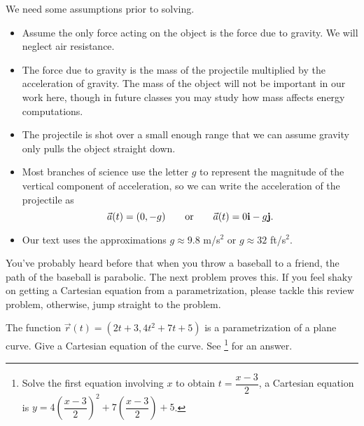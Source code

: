 We need some assumptions prior to solving. 
\begin{itemize}
 \item Assume the only force acting on the object is the force due to gravity. We will neglect air resistance. 
 \item The force due to gravity is the mass of the projectile multiplied by the acceleration of gravity. The mass of the object will not be important in our work here, though in future classes you may study how mass affects energy computations. 
 \item The projectile is shot over a small enough range that we can assume gravity only pulls the object straight down.
 \item Most branches of science use the letter $g$ to represent the magnitude of the vertical component of acceleration, so we can write the acceleration of the projectile as 
$$\vec a(t) = (0,-g) \quad \quad \text{or}\quad \quad \vec a(t)= 0{\bf i}-g{\bf j}.$$ 
 \item Our text uses the approximations $g\approx 9.8$ m/s$^2$ or $g\approx32$ ft/s$^2$. 
\end{itemize}


You've probably heard before that when you throw a baseball to a friend, the path of the baseball is parabolic. The next problem proves this. If you feel shaky on getting a Cartesian equation from a parametrization, please tackle this review problem, otherwise, jump straight to the problem.
\begin{review*}
 The function $\vec r(t) = (2t+3, 4t^2+7t+5)$ is a parametrization of a plane curve.  Give a Cartesian equation of the curve. 
 See \footnote{Solve the first equation involving $x$ to obtain $t=\dfrac{x-3}{2}$, a Cartesian equation is $y = 4\left(\dfrac{x-3}{2}\right)^2+7\left(\dfrac{x-3}{2}\right)+5$. } for an answer.
\end{review*}


